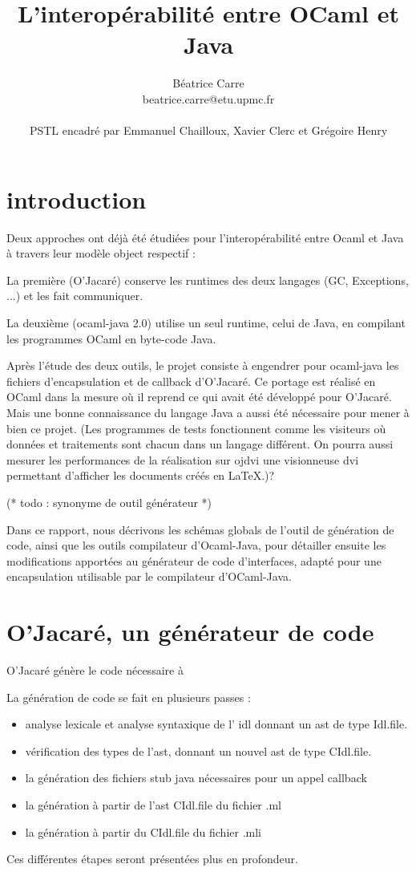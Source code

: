 \documentclass[a4paper, 11pt, notitlepage]{article}
\title{
  \huge L'interopérabilité entre OCaml et Java\\
}
\author{
  Béatrice Carre \\
  beatrice.carre@etu.upmc.fr \\
  \\
  PSTL encadré par Emmanuel Chailloux, Xavier Clerc et Grégoire Henry \\
}
\begin{document}
\maketitle
\section*{introduction}
Deux approches ont déjà été étudiées pour l’interopérabilité entre
Ocaml et Java à travers leur modèle object respectif :

La première (O’Jacaré) conserve les runtimes des deux langages (GC,
Exceptions, ...) et les fait communiquer.

La deuxième (ocaml-java 2.0) utilise un seul runtime, celui de Java, en
compilant les programmes OCaml en byte-code Java.
\newline

Après l’étude des deux outils, le projet consiste à engendrer pour
ocaml-java les fichiers d’encapsulation et de callback d’O’Jacaré. Ce
portage est réalisé en OCaml dans la mesure où il reprend ce qui
avait été développé pour O’Jacaré. Mais une bonne connaissance du
langage Java a aussi été nécessaire pour mener à bien ce projet.
(Les programmes de tests fonctionnent comme les visiteurs
où données et traitements sont chacun dans un langage différent. On
pourra aussi mesurer les performances de la réalisation sur ojdvi une
visionneuse dvi permettant d’afficher les documents créés en LaTeX.)?
\newline

(* todo : synonyme de outil générateur *)

Dans ce rapport, nous décrivons les schémas globals de l'outil de
génération de code, ainsi que les outils compilateur d'Ocaml-Java, pour détailler
ensuite les modifications apportées au générateur de code
d'interfaces, adapté pour une encapsulation utilisable par le
compilateur d'OCaml-Java. 











\section{O'Jacaré, un générateur de code}
O'Jacaré génère le code nécessaire à

La génération de code se fait en plusieurs passes :
\begin{itemize}
\item analyse lexicale et analyse syntaxique de l' idl donnant un
  ast de type Idl.file.
\item vérification des types de l'ast, donnant un nouvel ast de type
  CIdl.file.
\item la génération des fichiers stub java nécessaires pour un appel callback 
\item la génération à partir de l'ast CIdl.file du fichier .ml
\item la génération à partir du CIdl.file du fichier .mli
\end{itemize}
Ces différentes étapes seront présentées plus en profondeur.
\end{document}
